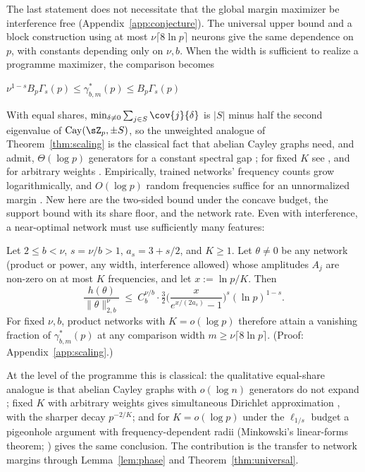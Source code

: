 The last statement does not necessitate that the global margin maximizer be interference free (Appendix~\ref{app:conjecture}). The universal upper bound and a block construction using at most $\nu\lceil8\ln p\rceil$ neurons give the same dependence on $p$, with constants depending only on $\nu,b$. When the width is sufficient to realize a programme maximizer, the comparison becomes 

$\nu^{1-s}B_p\Gamma_s(p)\le\gamma^*_{b,m}(p)\le B_p\Gamma_s(p)$ 

With equal shares, $\min_{\delta\ne0}\sum_{j\in S}\cov{j}{\delta}$ is $|S|$ minus half the second eigenvalue of $\mathrm{Cay}(\sZ_p,\pm S)$, so the unweighted analogue of Theorem~\ref{thm:scaling} is the classical fact that abelian Cayley graphs need, and admit, $\Theta(\log p)$ generators for a constant spectral gap \citep[Sec.~3]{alon1994random}; for fixed $K$ see \citet{friedman2006spectral}, and for arbitrary weights \citet{wang2025positive}. Empirically, trained networks' frequency counts grow logarithmically, and $O(\log p)$ random frequencies suffice for an unnormalized margin \citep{mccracken2025}. New here are the two-sided bound under the concave budget, the support bound with its share floor, and the network rate. Even with interference, a near-optimal network must use sufficiently many features:

\begin{corollary}[]\label{cor:few}
Let $2\le b<\nu$, $s=\nu/b>1$, $a_s=3+s/2$, and $K\ge1$. Let $\theta\neq0$ be any network (product or power, any width, interference allowed) whose amplitudes $A_j$ are non-zero on at most $K$ frequencies, and let $x:=\ln p/K$. Then
\[
\frac{h(\theta)}{\|\theta\|_{2,b}^\nu}\ \le\ C_b^{\nu/b}\cdot\tfrac32\Big(\frac{x}{e^{x/(2a_s)}-1}\Big)^{s}(\ln p)^{1-s}.
\]
For fixed $\nu,b$, product networks with $K=o(\log p)$ therefore attain a vanishing fraction of $\gamma^*_{b,m}(p)$ at any comparison width $m\ge\nu\lceil8\ln p\rceil$. (Proof: Appendix~\ref{app:scaling}.)
\end{corollary}

At the level of the programme this is classical: the qualitative equal-share analogue is that abelian Cayley graphs with $o(\log n)$ generators do not expand \citep[Prop.~3]{alon1994random}; fixed $K$ with arbitrary weights gives simultaneous Dirichlet approximation \citep{schmidt1980diophantine}, with the sharper decay $p^{-2/K}$; and for $K=o(\log p)$ under the $\ell_{1/s}$ budget a pigeonhole argument with frequency-dependent radii (Minkowski's linear-forms theorem; \citealp{cassels1959introduction}) gives the same conclusion. The contribution is the transfer to network margins through Lemma~\ref{lem:phase} and Theorem~\ref{thm:universal}.

